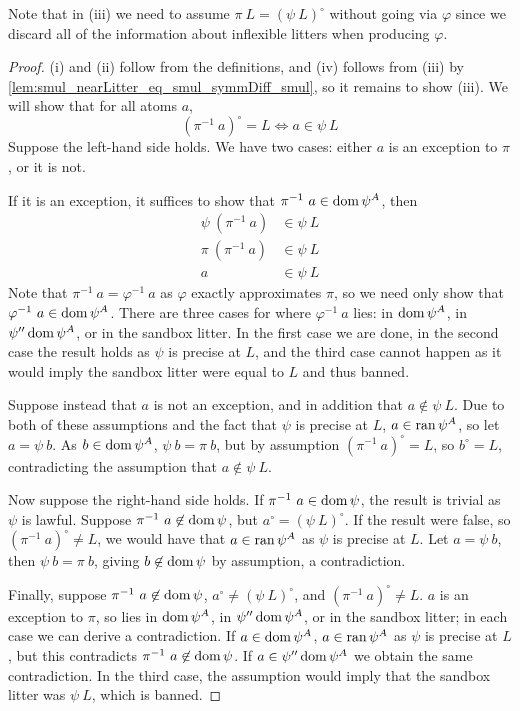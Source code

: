 Note that in (iii) we need to assume \( \pi\ L = (\psi\ L)^\circ \) without going via \( \varphi \) since we discard all of the information about inflexible litters when producing \( \varphi \).
\begin{proof}
    (i) and (ii) follow from the definitions, and (iv) follows from (iii) by \cref{lem:smul_nearLitter_eq_smul_symmDiff_smul}, so it remains to show (iii).
    We will show that for all atoms \( a \),
    \[ (\pi^{-1}\ a)^\circ = L \Leftrightarrow a \in \psi\ L \]
    Suppose the left-hand side holds.
    We have two cases: either \( a \) is an exception to \( \pi \), or it is not.

    If it is an exception, it suffices to show that \( \pi^{-1}\ a \in \operatorname{dom} \psi^A \), then
    \begin{align*}
        \psi\ (\pi^{-1}\ a) &\in \psi\ L \\
        \pi\ (\pi^{-1}\ a) &\in \psi\ L \\
        a &\in \psi\ L
    \end{align*}
    Note that \( \pi^{-1}\ a = \varphi^{-1}\ a \) as \( \varphi \) exactly approximates \( \pi \), so we need only show that \( \varphi^{-1}\ a \in \operatorname{dom} \psi^A \).
    There are three cases for where \( \varphi^{-1}\ a \) lies: in \( \operatorname{dom} \psi^A \), in \( \psi '' \operatorname{dom} \psi^A \), or in the sandbox litter.
    In the first case we are done, in the second case the result holds as \( \psi \) is precise at \( L \), and the third case cannot happen as it would imply the sandbox litter were equal to \( L \) and thus banned.

    Suppose instead that \( a \) is not an exception, and in addition that \( a \not\in \psi\ L \).
    Due to both of these assumptions and the fact that \( \psi \) is precise at \( L \), \( a \in \operatorname{ran} \psi^A \), so let \( a = \psi\ b \).
    As \( b \in \operatorname{dom} \psi^A \), \( \psi\ b = \pi\ b \), but by assumption \( (\pi^{-1}\ a)^\circ = L \), so \( b^\circ = L \), contradicting the assumption that \( a \not\in \psi\ L \).

    Now suppose the right-hand side holds.
    If \( \pi^{-1}\ a \in \operatorname{dom} \psi \), the result is trivial as \( \psi \) is lawful.
    Suppose \( \pi^{-1}\ a \not\in \operatorname{dom} \psi \), but \( a^\circ = (\psi\ L)^\circ \).
    If the result were false, so \( (\pi^{-1}\ a)^\circ \neq L \), we would have that \( a \in \operatorname{ran} \psi^A \) as \( \psi \) is precise at \( L \).
    Let \( a = \psi\ b \), then \( \psi\ b = \pi\ b \), giving \( b \not\in \operatorname{dom} \psi \) by assumption, a contradiction.

    Finally, suppose \( \pi^{-1}\ a \not\in \operatorname{dom} \psi \), \( a^\circ \neq (\psi\ L)^\circ \), and \( (\pi^{-1}\ a)^\circ \neq L \).
    \( a \) is an exception to \( \pi \), so lies in \( \operatorname{dom} \psi^A \), in \( \psi '' \operatorname{dom} \psi^A \), or in the sandbox litter; in each case we can derive a contradiction.
    If \( a \in \operatorname{dom} \psi^A \), \( a \in \operatorname{ran} \psi^A \) as \( \psi \) is precise at \( L \), but this contradicts \( \pi^{-1}\ a \not\in \operatorname{dom} \psi \).
    If \( a \in \psi '' \operatorname{dom} \psi^A \) we obtain the same contradiction.
    In the third case, the assumption would imply that the sandbox litter was \( \psi\ L \), which is banned.
\end{proof}
